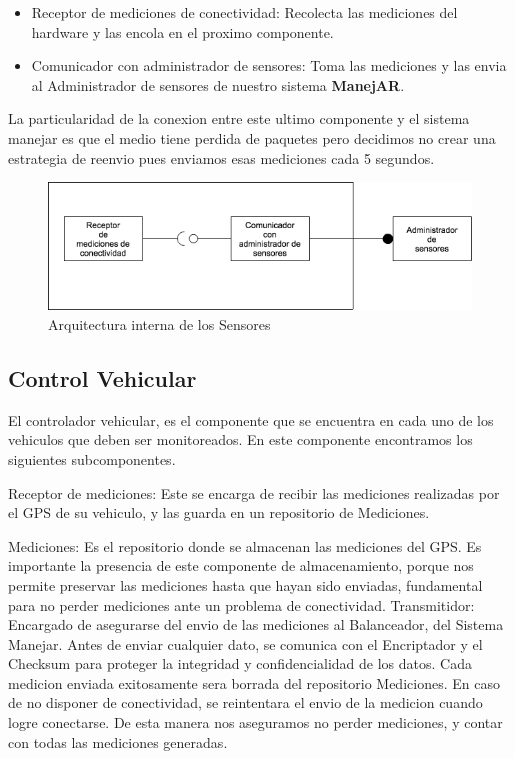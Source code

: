 \begin{itemize}
  \item Receptor de mediciones de conectividad: Recolecta las mediciones del 
  hardware y las encola en el proximo componente.
  
  \item Comunicador con administrador de sensores: Toma las mediciones y las 
  envia al Administrador de sensores de nuestro sistema \textbf{ManejAR}.
  \end{itemize}


La particularidad de la conexion entre este ultimo componente y el sistema 
manejar es que el medio tiene perdida de paquetes pero decidimos no crear una 
estrategia de reenvio pues enviamos esas mediciones cada 5 segundos.


\begin{figure}
\centerline{\includegraphics[width=1\textwidth]{./imagenes/arquitectura_tp2/sensor.png}}
\caption{Arquitectura interna de los Sensores}
\end{figure}

\subsection{Control Vehicular}
El controlador vehicular, es el componente que se encuentra en cada uno de los vehiculos que deben
ser monitoreados. En este componente encontramos los siguientes subcomponentes.

Receptor de mediciones: Este se encarga de recibir las mediciones realizadas por el GPS de su vehiculo,
 y las guarda en un repositorio de Mediciones.
 
Mediciones: Es el repositorio donde se almacenan las mediciones del GPS.
 Es importante la presencia de este componente de almacenamiento, porque nos permite preservar
las mediciones hasta que hayan sido enviadas, fundamental para no perder mediciones ante un
 problema de conectividad.
Transmitidor: Encargado de asegurarse del envio de las mediciones al Balanceador, del Sistema Manejar.
Antes de enviar cualquier dato, se comunica con el Encriptador y el Checksum para proteger la
integridad y confidencialidad de los datos. Cada medicion enviada exitosamente sera borrada del
repositorio Mediciones. En caso de no disponer de conectividad, se reintentara el envio de la medicion
cuando logre conectarse. De esta manera nos aseguramos no perder mediciones, y
 contar con todas las mediciones generadas.

